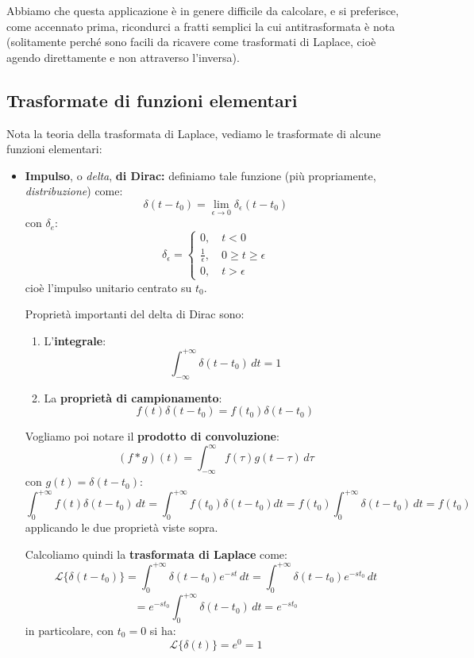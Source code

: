 \documentclass[a4paper,11pt]{article}
\begin{document}
Abbiamo che questa applicazione è in genere difficile da calcolare, e si preferisce, come accennato prima, ricondurci a fratti semplici la cui antitrasformata è nota (solitamente perché sono facili da ricavere come trasformati di Laplace, cioè agendo direttamente e non attraverso l'inversa).

\subsection{Trasformate di funzioni elementari}
Nota la teoria della trasformata di Laplace, vediamo le trasformate di alcune funzioni elementari:
\begin{itemize}
	\item \textbf{Impulso}, o \textit{delta}, \textbf{di Dirac:} definiamo tale funzione (più propriamente, \textit{distribuzione}) come:
		$$
			\delta(t - t_0) = \lim_{\epsilon \rightarrow 0} \delta_\epsilon (t - t_0)
		$$
		con $\delta_e$:
		$$
			\delta_\epsilon =
				\begin{cases}
						0, \quad t < 0 \\
						\frac{1}{\epsilon}, \quad 0 \geq t \geq \epsilon \\
						0, \quad t > \epsilon
				\end{cases}
		$$
		cioè l'impulso unitario centrato su $t_0$.

		Proprietà importanti del delta di Dirac sono:
		\begin{enumerate}
			\item L'\textbf{integrale}:		
				$$
				\int_{-\infty}^{+\infty} \delta(t - t_0) \, dt = 1
				$$
			\item La \textbf{proprietà di campionamento}:	
				$$
				f(t) \delta(t - t_0) = f(t_0) \delta(t - t_0)
				$$
		\end{enumerate}

		Vogliamo poi notare il \textbf{prodotto di convoluzione}:
		$$
		(f * g)(t) = \int_{-\infty}^{\infty} f(\tau) g(t - \tau) \, d\tau
		$$
		con $g(t) = \delta(t - t_0)$:
		$$
		\int_0^{+\infty} f(t) \delta (t - t_0) \, dt = \int_0^{+\infty} f(t_0) \delta(t - t_0) dt = f(t_0) \int_0^{+\infty} \delta (t - t_0) \, dt = f(t_0)
		$$
		applicando le due proprietà viste sopra.

		Calcoliamo quindi la \textbf{trasformata di Laplace} come:
		$$
		\mathcal{L}\{\delta(t - t_0)\} = \int_{0}^{+\infty} \delta(t - t_0) e^{-st} \, dt = \int_{0}^{+\infty} \delta(t - t_0) e^{-s t_0} \, dt 
		$$
		$$
		= e^{-s t_0} \int_0^{+\infty} \delta(t - t_0) \, dt = e^{-s t_0}
		$$
		in particolare, con $t_0 = 0$ si ha:
		$$
		\mathcal{L}\{\delta(t)\} = e^0 = 1
		$$


\end{itemize}
\end{document}
